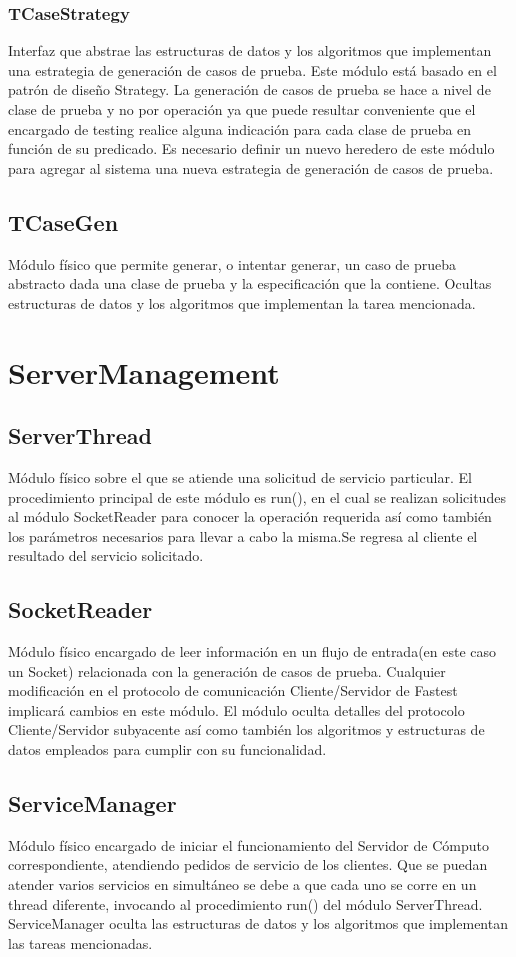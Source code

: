 \documentclass[a4paper,10pt]{report}
\begin{document}
			\subsubsection{TCaseStrategy}
			Interfaz que abstrae las estructuras de datos y los algoritmos que implementan una estrategia de generación de casos de prueba. Este módulo está basado en el patrón de diseño Strategy. La generación de casos de prueba se hace a nivel de clase de prueba y no por operación ya que puede resultar conveniente que el encargado de testing realice alguna indicación para cada clase de prueba en función de su predicado. Es necesario definir un nuevo heredero de este módulo para agregar al sistema una nueva estrategia de generación de casos de prueba.
		\subsection{TCaseGen}
		Módulo físico que permite generar, o intentar generar, un caso de prueba abstracto dada una clase de prueba y la especificación que la contiene. Ocultas estructuras de datos y los algoritmos que implementan la tarea mencionada. 
	\section{ServerManagement}
		\subsection{ServerThread}
		Módulo físico sobre el que se atiende una solicitud de servicio particular. El procedimiento principal de este módulo es run(), en el cual se realizan solicitudes al módulo SocketReader para conocer la operación requerida así como también los parámetros necesarios para llevar a cabo la misma.Se regresa al cliente el resultado del servicio solicitado.
		\subsection{SocketReader}
		Módulo físico encargado de leer información en un flujo de entrada(en este caso un Socket) relacionada con la generación de casos de prueba. Cualquier modificación en el protocolo de comunicación Cliente/Servidor de Fastest implicará cambios en este módulo. El módulo oculta detalles del protocolo Cliente/Servidor subyacente así como también los algoritmos y estructuras de datos empleados para cumplir con su funcionalidad. 
		\subsection{ServiceManager}
		Módulo físico encargado de iniciar el funcionamiento del Servidor de Cómputo correspondiente, atendiendo pedidos de servicio de los clientes. Que se puedan atender varios servicios en simultáneo se debe a que cada uno se corre en un thread diferente, invocando al procedimiento run() del módulo ServerThread. ServiceManager oculta las estructuras de datos y los algoritmos que implementan las tareas mencionadas.
\end{document}
